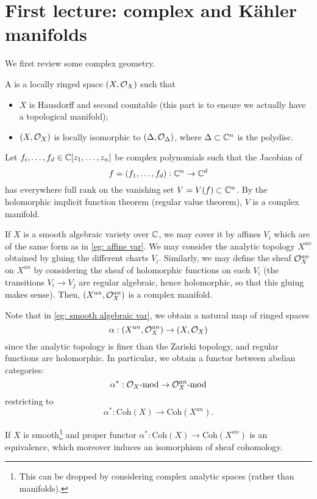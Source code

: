 \section{First lecture: complex and Kähler manifolds}
We first review some complex geometry.
\begin{definition}
	A  is a locally ringed space $(X,\mathcal{O}_X)$ such that
	\begin{itemize}
		\item $X$ is Hausdorff and second countable (this part is to ensure we actually have a topological manifold);
		\item $(X,\mathcal{O}_X)$ is locally isomorphic to $(\Delta,\mathcal{O}_\Delta)$, where $\Delta\subset \mathbb C^n$ is the polydisc.\qedbarhere 
	\end{itemize} 
\end{definition}
\begin{example}\label{eg: affine var}
	Let $f_i,\dots,f_d\in\mathbb C[z_1,\dots,z_n]$ be complex polynomials such that the Jacobian of
	\[f=(f_1,\dots,f_d):\mathbb C^n\to \mathbb C^d
	\]
	has everywhere full rank on the vanishing set $V=V(f)\subset \mathbb C^n$. By the holomorphic implicit function theorem (regular value theorem), $V$ is a complex manifold.
\end{example}
\begin{example}\label{eg: smooth algebraic var}
	If $X$ is a smooth algebraic variety over $\mathbb C$, we may cover it by affines $V_i$ which are of the same form as in \autoref{eg: affine var}. We may consider the analytic topology $X^{an}$ obtained by gluing the different charts $V_i$. Similarly, we may define the sheaf $\mathcal{O}_X^{an}$ on $X^{an}$ by considering the sheaf of holomorphic functions on each $V_i$ (the transitions $V_i\to V_j$ are regular algebraic, hence holomorphic, so that this gluing makes sense). Then, $(X^{an},\mathcal{O}_X^{an})$ is a complex manifold.
\end{example}

Note that in \autoref{eg: smooth algebraic var}, we obtain a natural map of ringed spaces
%
\[
\alpha:(X^{an},\mathcal{O}_X^{an})\to (X,\mathcal{O}_X)
\]
since the analytic topology is finer than the Zariski topology, and regular functions are holomorphic. In particular, we obtain a functor between abelian categories:
\[
\alpha^*:\mathcal{O}_X\text{-mod}\to \mathcal{O}_X^{an}\text{-mod}
\]
restricting to
\[
\alpha^*:\text{Coh}(X)\to \text{Coh}(X^{an}).
\]
\begin{theorem}
	If $X$ is smooth\footnote{This can be dropped by considering complex analytic spaces (rather than manifolds).} and proper functor $\alpha^*:\text{Coh}(X)\to\text{Coh}(X^{an})$ is an equivalence, which moreover induces an isomorphism of sheaf cohomology.
\end{theorem}
